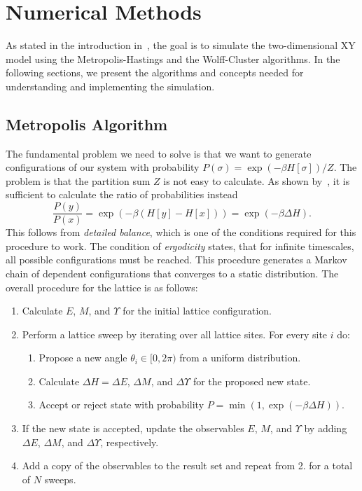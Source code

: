 \section{Numerical Methods}\label{sec:theo:numerical_methods}
	As stated in the introduction in~, the goal is to simulate the two-dimensional XY model using the Metropolis-Hastings and the Wolff-Cluster algorithms. In the following sections, we present the algorithms and concepts needed for understanding and implementing the simulation.

	\subsection{Metropolis Algorithm}\label{sec:theo:metropolis}
		The fundamental problem we need to solve is that we want to generate configurations of our system with probability $P(\sigma) = \exp{(-\beta H[\sigma])}/Z$. The problem is that the partition sum $Z$ is not easy to calculate. As shown by~\citet{metropolis}, it is sufficient to calculate the ratio of probabilities instead
		\begin{equation}
			\frac{P(y)}{P(x)} = \exp{(-\beta(H[y] - H[x]))} = \exp{(-\beta \Delta H)}.
		\end{equation}
		This follows from \emph{detailed balance}, which is one of the conditions required for this procedure to work. The condition of \emph{ergodicity} states, that for infinite timescales, all possible configurations must be reached. This procedure generates a Markov chain of dependent configurations that converges to a static distribution. The overall procedure for the lattice is as follows:
		\begin{enumerate}
			\item Calculate $E$, $M$, and $\Upsilon$ for the initial lattice configuration.
			\item Perform a lattice sweep by iterating over all lattice sites. For every site $i$ do:
			\begin{enumerate}
				\item Propose a new angle $\theta_i \in [0,2\pi)$ from a uniform distribution.
				\item Calculate $\Delta H = \Delta E$, $\Delta M$, and $\Delta \Upsilon$ for the proposed new state.
				\item Accept or reject state with probability $P = \min{(1, \exp{(-\beta\Delta H)})}$.
			\end{enumerate}
			\item If the new state is accepted, update the observables $E$, $M$, and $\Upsilon$ by adding $\Delta E$, $\Delta M$, and $\Delta \Upsilon$, respectively.
			\item Add a copy of the observables to the result set and repeat from 2. for a total of $N$ sweeps.
		\end{enumerate}
		

